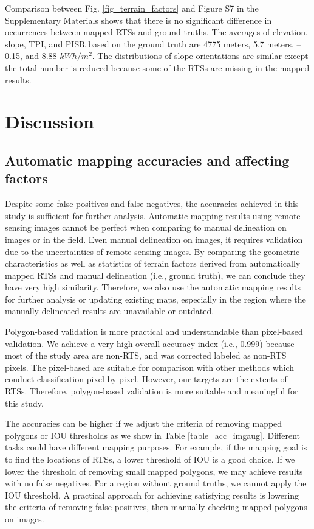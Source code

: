 \documentclass[preprint,12pt,authoryear]{elsarticle}
\begin{document}
Comparison between Fig. \ref{fig_terrain_factors} and Figure S7 in the Supplementary Materials shows that there is no significant difference in occurrences between mapped RTSs and ground truths. The averages of elevation, slope, TPI, and PISR based on the ground truth are 4775 meters, 5.7 meters, --0.15, and 8.88 $kWh/m^2$. The distributions of slope orientations are similar except the total number is reduced because some of the RTSs are missing in the mapped results. 

\section{Discussion}
\label{sec_discussion}

\subsection{Automatic mapping accuracies and affecting factors}
\label{subsec_acc_factors}

Despite some false positives and false negatives, the accuracies achieved in this study is sufficient for further analysis. Automatic mapping results using remote sensing images cannot be perfect when comparing to manual delineation on images or in the field. Even manual delineation on images, it requires validation due to the uncertainties of remote sensing images. By comparing the geometric characteristics as well as statistics of terrain factors derived from automatically mapped RTSs and manual delineation (i.e., ground truth), we can conclude they have very high similarity. Therefore, we also use the automatic mapping results for further analysis or updating existing maps, especially in the region where the manually delineated results are unavailable or outdated. 

Polygon-based validation is more practical and understandable than pixel-based validation. We achieve a very high overall accuracy index (i.e., 0.999) because most of the study area are non-RTS, and was corrected labeled as non-RTS pixels. The pixel-based are suitable for comparison with other methods which conduct classification pixel by pixel. However, our targets are the extents of RTSs. Therefore, polygon-based validation is more suitable and meaningful for this study.

The accuracies can be higher if we adjust the criteria of removing mapped polygons or IOU thresholds as we show in Table \ref{table_acc_imgaug}. Different tasks could have different mapping purposes. For example, if the mapping goal is to find the locations of RTSs, a lower threshold of IOU is a good choice. If we lower the threshold of removing small mapped polygons, we may achieve results with no false negatives. For a region without ground truths, we cannot apply the IOU threshold. A practical approach for achieving satisfying results is lowering the criteria of removing false positives, then manually checking mapped polygons on images. 
\end{document}
